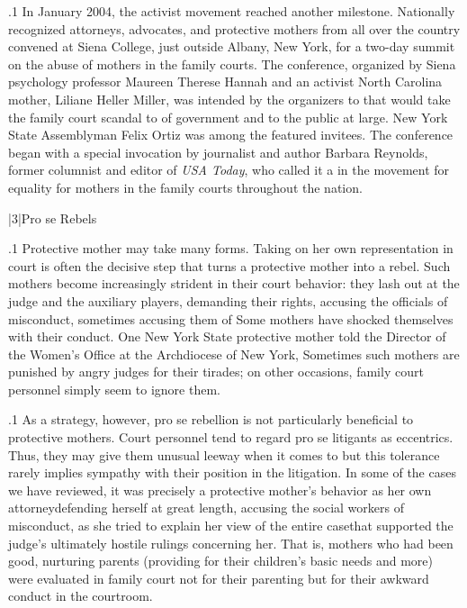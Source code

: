 \documentclass[11pt, twoside]{article}
\begin{document}
{\p.1{%
In January 2004, the activist movement reached another milestone.
Nationally recognized attorneys, advocates, and protective mothers
from all over the country convened at Siena College, just outside Albany, New York, for a two-day summit on the abuse of mothers in the
family courts. The conference, organized by Siena psychology professor Maureen Therese Hannah and an activist North Carolina mother,
Liliane Heller Miller, was intended by the organizers to  that would take the family court scandal to  of government and to the public at large. New York State
Assemblyman Felix Ortiz was among the featured invitees. The conference began with a special invocation by journalist and author Barbara Reynolds,
former columnist and editor of \textit{USA Today}, who called it a  in the movement for equality for mothers in the family courts
throughout the nation.
}%


\s|3|{Pro se Rebels}

\p.1{%
\noindent{}Protective mother  may take many forms. Taking on her own
representation in court is often the decisive step that turns a protective
mother into a rebel. Such mothers become increasingly strident in their
court behavior: they lash out at the judge and the auxiliary players, demanding their rights, accusing the officials of misconduct, sometimes
accusing them of  Some mothers have shocked themselves with their conduct. One New York State protective mother told
the Director of the Women’s Office at the Archdiocese of New York,  Sometimes such mothers are
punished by angry judges for their tirades; on other occasions, family
court personnel simply seem to ignore them.
}%

\p.1{%
As a strategy, however, pro se rebellion is not particularly beneficial
to protective mothers. Court personnel tend to regard pro se litigants as
eccentrics. Thus, they may give them unusual leeway when it comes to
 but this tolerance rarely implies sympathy with their position in the litigation. In some of the cases we have reviewed, it was
precisely a protective mother’s behavior as her own attorney\mdash{}defending
herself at great length, accusing the social workers of misconduct,  as she tried to explain her view of the entire case\mdash{}that supported
the judge’s ultimately hostile rulings concerning her. That is, mothers
who had been good, nurturing parents (providing for their children’s
basic needs and more) were evaluated in family court not for their
parenting but for their awkward conduct in the courtroom.
}%


}
\end{document}
